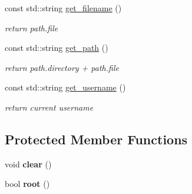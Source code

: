 \begin{DoxyCompactItemize}
\mbox{\label{class_directory_ac632fb50196d0cceab655863bbf69f18}} 
const std\+::string \mbox{\hyperlink{class_directory_ac632fb50196d0cceab655863bbf69f18}{get\+\_\+filename}} ()
\begin{DoxyCompactList}\small\item\em return path.\+file \end{DoxyCompactList}\item 
\mbox{\label{class_directory_a482645277603ef32cccc41d144ab2f4e}} 
const std\+::string \mbox{\hyperlink{class_directory_a482645277603ef32cccc41d144ab2f4e}{get\+\_\+path}} ()
\begin{DoxyCompactList}\small\item\em return path.\+directory + path.\+file \end{DoxyCompactList}\item 
\mbox{\label{class_directory_a5226980ca7e90c292032a04a308f812a}} 
const std\+::string \mbox{\hyperlink{class_directory_a5226980ca7e90c292032a04a308f812a}{get\+\_\+username}} ()
\begin{DoxyCompactList}\small\item\em return current username \end{DoxyCompactList}\end{DoxyCompactItemize}
\subsection*{Protected Member Functions}
\begin{DoxyCompactItemize}
\item 
\mbox{\label{class_directory_a63681e65191b8c08c66bd8a5b01bd304}} 
void {\bfseries clear} ()
\item 
\mbox{\label{class_directory_a1f4dbc8eb485cd10226408ae0193d79f}} 
bool {\bfseries root} ()
\end{DoxyCompactItemize}
